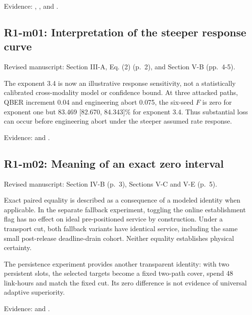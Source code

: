 \documentclass[a4paper,11pt]{article}
\begin{document}
Evidence: , , and .

\subsection{R1-m01: Interpretation of the steeper response curve}\label{r1-m01-interpretation-of-the-steeper-response-curve}

Revised manuscript: Section III-A, Eq. (2) (p.~2), and Section V-B (pp.~4-5).

The exponent 3.4 is now an illustrative response sensitivity, not a statistically calibrated cross-modality model or confidence bound. At three attacked paths, QBER increment 0.04 and engineering abort 0.075, the six-seed \(F\) is zero for exponent one but 83.469 {[}82.670, 84.343{]}\% for exponent 3.4. Thus substantial loss can occur before engineering abort under the steeper assumed rate response.

Evidence:  and .

\subsection{R1-m02: Meaning of an exact zero interval}\label{r1-m02-meaning-of-an-exact-zero-interval}

Revised manuscript: Section IV-B (p.~3), Sections V-C and V-E (p.~5).

Exact paired equality is described as a consequence of a modeled identity when applicable. In the separate fallback experiment, toggling the online establishment flag has no effect on ideal pre-positioned service by construction. Under a transport cut, both fallback variants have identical service, including the same small post-release deadline-drain cohort. Neither equality establishes physical certainty.

The persistence experiment provides another transparent identity: with two persistent slots, the selected targets become a fixed two-path cover, spend 48 link-hours and match the fixed cut. Its zero difference is not evidence of universal adaptive superiority.

Evidence:  and .
\end{document}
